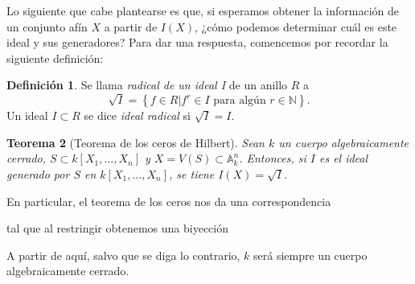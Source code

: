 \documentclass[12pt,a4paper]{article}
\newtheorem{thm}{Teorema}[section]
\theoremstyle{definition} \newtheorem{defn}[thm]{Definición}
\theoremstyle{definition} \newtheorem{ejemplo}[thm]{Ejemplo}
\theoremstyle{definition} \newtheorem{ejercicio}[thm]{Ejercicio}
\theoremstyle{remark} \newtheorem*{obs}{Observación}
\def\AA{\mathbb{A}}
\def\NN{\mathbb{N}}
\begin{document}
  Lo siguiente que cabe plantearse es que, si esperamos obtener la información de un conjunto afín $X$ a partir de $I(X)$, ¿cómo podemos determinar cuál es este ideal y sus generadores? Para dar una respuesta, comencemos por recordar la siguiente definición:
  \begin{defn}
    Se llama \emph{radical de un ideal I} de un anillo $R$ a
    \begin{equation*}
      \sqrt{I}=\left\{ f\in R | f^r\in I \text{ para algún } r \in \NN \right\}.
    \end{equation*}
  Un ideal $I\subset R$ se dice \emph{ideal radical} si $\sqrt{I}=I$.
  \end{defn}

  \begin{thm}[Teorema de los ceros de Hilbert]
    Sean $k$ un cuerpo algebraicamente cerrado, $S\subset k[X_1,\dots,X_n]$ y $X=V(S)\subset \AA_k^n$. Entonces, si $I$ es el ideal generado por $S$ en $k[X_1,\dots,X_n]$, se tiene $I(X)=\sqrt{I}$.
  \end{thm}
  En particular, el teorema de los ceros nos da una correspondencia
  \begin{center}
  \end{center}
  tal que al restringir obtenemos una biyección
  \begin{center}
  \end{center}
  A partir de aquí, salvo que se diga lo contrario, $k$ será siempre un cuerpo algebraicamente cerrado.
\end{document}
